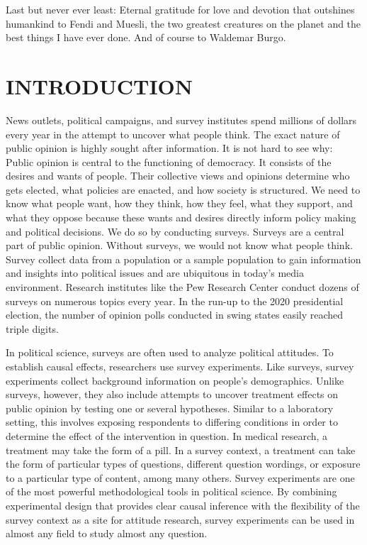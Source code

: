 \documentclass[12pt,econ]{sources/authesis}
\begin{document}
\begin{frontmatter}
{Last but never ever least: Eternal gratitude for love and devotion that outshines humankind to Fendi and Muesli, the two greatest creatures on the planet and the best things I have ever done. And of course to Waldemar Burgo.}


\listoftables

\listoffigures

\tableofcontents


\end{frontmatter}

\hypertarget{intro}{%
\chapter{INTRODUCTION}\label{intro}}

News outlets, political campaigns, and survey institutes spend millions of dollars every year in the attempt to uncover what people think. The exact nature of public opinion is highly sought after information. It is not hard to see why: Public opinion is central to the functioning of democracy. It consists of the desires and wants of people. Their collective views and opinions determine who gets elected, what policies are enacted, and how society is structured. We need to know what people want, how they think, how they feel, what they support, and what they oppose because these wants and desires directly inform policy making and political decisions. We do so by conducting surveys. Surveys are a central part of public opinion. Without surveys, we would not know what people think. Survey collect data from a population or a sample population to gain information and insights into political issues and are ubiquitous in today's media environment. Research institutes like the Pew Research Center conduct dozens of surveys on numerous topics every year. In the run-up to the 2020 presidential election, the number of opinion polls conducted in swing states easily reached triple digits.

In political science, surveys are often used to analyze political attitudes. To establish causal effects, researchers use survey experiments. Like surveys, survey experiments collect background information on people's demographics. Unlike surveys, however, they also include attempts to uncover treatment effects on public opinion by testing one or several hypotheses. Similar to a laboratory setting, this involves exposing respondents to differing conditions in order to determine the effect of the intervention in question. In medical research, a treatment may take the form of a pill. In a survey context, a treatment can take the form of particular types of questions, different question wordings, or exposure to a particular type of content, among many others. Survey experiments are one of the most powerful methodological tools in political science. By combining experimental design that provides clear causal inference with the flexibility of the survey context as a site for attitude research, survey experiments can be used in almost any field to study almost any question.
\end{document}
